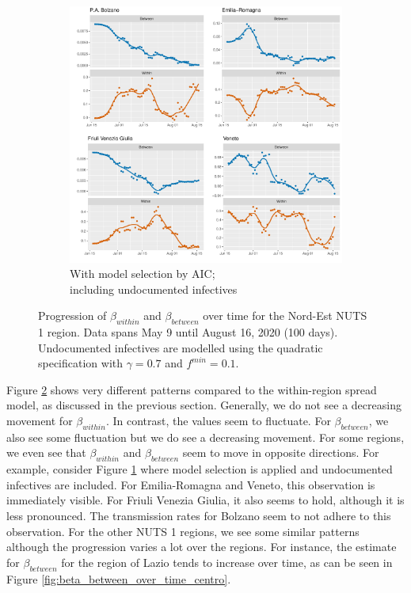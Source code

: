\documentclass[12pt]{article}
\begin{document}
    \begin{figure}[H]\ContinuedFloat
	    \begin{subfigure}{\textwidth}
	      \centering
	      \includegraphics[width=\linewidth]{output/model_between_lag14_betas_Nord-Est_aic_UndocQuadratic_rolling.pdf}
	      \caption{With model selection by AIC; \\ including undocumented infectives}
	      \label{fig:beta_between_over_time_nordest_aic_undoc}
	    \end{subfigure}
	    \caption{Progression of $\beta_{within}$ and $\beta_{between}$ over time for the Nord-Est NUTS 1 region. Data spans May 9 until August 16, 2020 (100 days). Undocumented infectives are modelled using the quadratic specification with $\gamma = 0.7$ and $f^{min}=0.1$.}
	    \label{fig:beta_between_over_time_nordest}
    \end{figure}
	
	Figure \ref{fig:beta_between_over_time_nordest} shows very different patterns compared to the within-region spread model, as discussed in the previous section. Generally, we do not see a decreasing movement for $\beta_{within}$. In contrast, the values seem to fluctuate. For $\beta_{between}$, we also see some fluctuation but we do see a decreasing movement. For some regions, we even see that $\beta_{within}$ and $\beta_{between}$ seem to move in opposite directions. For example, consider Figure \ref{fig:beta_between_over_time_nordest_aic_undoc} where model selection is applied and undocumented infectives are included. For Emilia-Romagna and Veneto, this observation is immediately visible. For Friuli Venezia Giulia, it also seems to hold, although it is less pronounced. The transmission rates for Bolzano seem to not adhere to this observation. For the other NUTS 1 regions, we see some similar patterns although the progression varies a lot over the regions. For instance, the estimate for $\beta_{between}$ for the region of Lazio tends to increase over time, as can be seen in Figure \ref{fig:beta_between_over_time_centro}. \\
	
\end{document}
